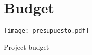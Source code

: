 \chapter{Budget}	
\begin{table}
\centering
\texttt{[image: presupuesto.pdf]} 
\caption{\label{tab:costs}Project budget}
\end{table}
